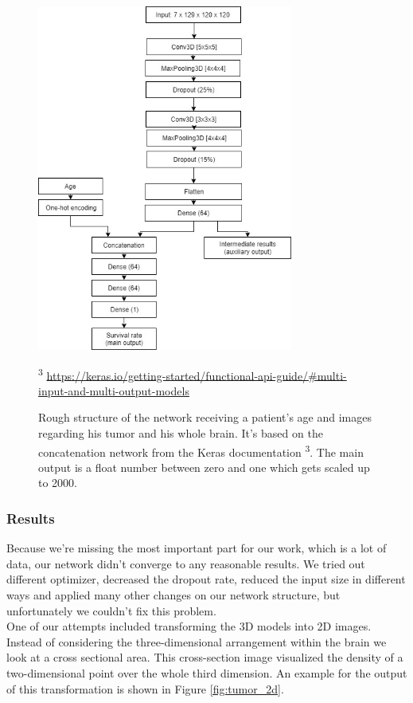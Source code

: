 \documentclass[a4paper,12pt,pagesize,headsepline,bibtotoc,titlepage]{scrartcl}
\begin{document}
\begin{figure}[hbp]
\begin{center}
\includegraphics*[width=0.75\textwidth]{images/sr_model.png}\\
\caption{Rough structure of the network receiving a patient's age and images regarding his tumor and his whole brain.
It's based on the concatenation network from the Keras documentation \textsuperscript{3}.
The main output is a float number between zero and one which gets scaled up to 2000.}
\vspace*{5mm}\small\textsuperscript{3} \url{https://keras.io/getting-started/functional-api-guide/#multi-input-and-multi-output-models}
\label{fig:sr_network}
\end{center}
\end{figure}

\subsubsection{Results}

Because we're missing the most important part for our work, which is a lot of data, our network didn't converge to any reasonable results.
We tried out different optimizer, decreased the dropout rate, reduced the input size in different ways and applied many other changes on our network structure, but unfortunately we couldn't fix this problem. \\
One of our attempts included transforming the 3D models into 2D images.
Instead of considering the three-dimensional arrangement within the brain we look at a cross sectional area.
This cross-section image visualized the density of a two-dimensional point over the whole third dimension. An example for the output of this transformation is shown in Figure \ref{fig:tumor_2d}. \\
\end{document}
